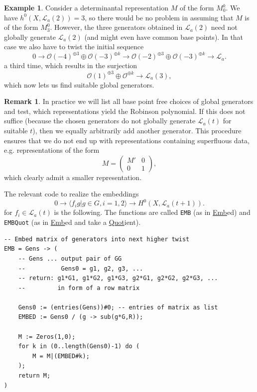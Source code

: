 \documentclass[a4paper,10pt]{amsart}
\theoremstyle{definition}
\newtheorem{ex}[Def]{Example}
\newtheorem{rem}[Def]{Remark}
\theoremstyle{plain}
\newcommand{\cL}{{\mathcal L}}
\newcommand{\cO}{{\mathcal O}}
\begin{document}
\begin{ex}
Consider a determinantal representation $M$ of the form $M_0^k$. We have $h^0(X, \cL_a(2)) = 3$, so there would be no problem in assuming that $M$ is of the form $M_3^0$. However, the three generators obtained in $\cL_a(2)$ need not globally generate $\cL_a(2)$ (and might even have common base points). In that case we also have to twist the initial sequence
\begin{equation*}
    0 \to \cO(-4)^{\oplus3} \oplus \cO(-3)^{\oplus k} \to \cO(-2)^{\oplus3} \oplus \cO(-3)^{\oplus k} \to \cL_a.
\end{equation*}
a third time, which results in the surjection
\begin{equation*}
    \cO(1)^{\oplus3} \oplus \cO^{\oplus k} \to \cL_a(3),
\end{equation*}
which now lets us find suitable global generators.
\end{ex}

\begin{rem}
    In practice we will list all base point free choices of global generators and test, which representations yield the Robinson polynomial. If this does not suffice (because the chosen generators do not globally generate $\cL_a(t)$ for suitable $t$), then we equally arbitrarily add another generator. This procedure ensures that we do not end up with representations containing superfluous data, e.g. representations of the form
    \begin{equation*}
        M = \begin{pmatrix}
            M' & 0 \\
            0 & 1
        \end{pmatrix},
    \end{equation*}
    which clearly admit a smaller representation.
\end{rem}

The relevant code to realize the embeddings
\begin{equation*}
    0 \to \langle f_i g | g \in G, i = 1,2 \rangle \to H^0(X, \cL_a(t+1)).
\end{equation*}
for $f_i \in \cL_a(t)$ is the following. The functions are called \texttt{EMB} (as in \underline{Emb}ed) and \texttt{EMBQuot} (as in \underline{Emb}ed and take a \underline{Quot}ient).

\begin{oframed}
\begin{verbatim}
-- Embed matrix of generators into next higher twist
EMB = Gens -> (
    -- Gens ... output pair of GG
    --          Gens0 = g1, g2, g3, ...
    -- return: g1*G1, g1*G2, g1*G3, g2*G1, g2*G2, g2*G3, ...
    --         in form of a row matrix
    
    Gens0 := (entries(Gens))#0; -- entries of matrix as list
    EMBED := Gens0 / (g -> sub(g*G,R));
    
    M := Zeros(1,0);
    for k in (0..length(Gens0)-1) do (
        M = M|(EMBED#k);
    );
    return M;
)
\end{verbatim}
\end{oframed}
\end{document}
